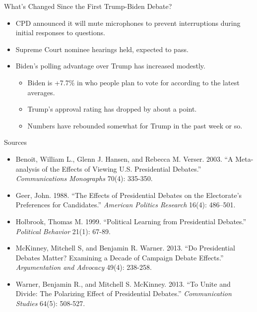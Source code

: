 \documentclass[dvipsnames,aspectratio=169]{beamer}
\newcommand{\pskp}{\pause\bigskip}
\begin{document}
\begin{frame}{What's Changed Since the First Trump-Biden Debate?}
    \begin{itemize}
        \item CPD announced it will mute microphones to prevent interruptions during initial responses to questions.
        \pskp
        \item Supreme Court nominee hearings held, expected to pass.
        \pskp
        \item Biden's polling advantage over Trump has increased modestly.
        \pskp
        \begin{itemize}
            \item Biden is +7.7\% in who people plan to vote for according to the latest averages.
            \item Trump's approval rating has dropped by about a point.
            \item Numbers have rebounded somewhat for Trump in the past week or so.
        \end{itemize}
    \end{itemize}
\end{frame}

\begin{frame}{Sources}
    \begin{itemize}
        \item Benoit, William L., Glenn J. Hansen, and Rebecca M. Verser. 2003. ``A Meta-analysis of the Effects of Viewing U.S. Presidential Debates.'' {\em Communications Monographs} 70(4): 335-350.
        \item Geer, John. 1988. ``The Effects of Presidential Debates on the Electorate's Preferences for Candidates.'' {\em American Politics Research} 16(4): 486--501.
        \item Holbrook, Thomas M. 1999. ``Political Learning from Presidential Debates.'' {\em Political Behavior} 21(1): 67-89.
        \item McKinney, Mitchell S, and Benjamin R. Warner. 2013. ``Do Presidential Debates Matter? Examining a Decade of Campaign Debate Effects.'' {\em Argumentation and Advocacy} 49(4): 238-258.
        \item Warner, Benjamin R., and Mitchell S. McKinney. 2013. ``To Unite and Divide: The Polarizing Effect of Presidential Debates.'' {\em Communication Studies} 64(5): 508-527.
    \end{itemize}
\end{frame}

\end{document}
